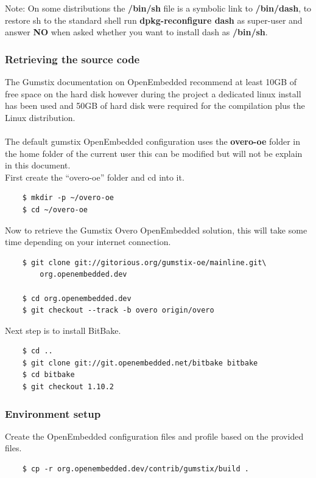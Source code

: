 \documentclass[11pt]{report} %
\begin{document}
		Note: On some distributions the {\bf /bin/sh} file is a symbolic link
		to  {\bf /bin/dash}, to restore sh to the standard shell run
		{\bf dpkg-reconfigure dash} as super-user and answer {\bf NO} when
		asked whether you want to install dash as {\bf /bin/sh}.

	\subsubsection{Retrieving the source code}
		The Gumstix documentation on OpenEmbedded recommend at least 10GB of
		free space on the hard disk however during the project a dedicated 
		linux install has been used and 50GB of hard disk were required for
		the compilation plus the Linux distribution.\\
		\\
		The default gumstix OpenEmbedded configuration uses the {\bf overo-oe}
		folder in the home folder of the current user this can be modified but
		will not be explain in this document.
		\\
		First create the ``overo-oe'' folder and cd into it.
\begin{lstlisting}
	$ mkdir -p ~/overo-oe
	$ cd ~/overo-oe
\end{lstlisting}
		
		Now to retrieve the Gumstix Overo OpenEmbedded solution, this will take
		some time depending on your internet connection.
\begin{lstlisting}
	$ git clone git://gitorious.org/gumstix-oe/mainline.git\
		org.openembedded.dev

	$ cd org.openembedded.dev
	$ git checkout --track -b overo origin/overo
\end{lstlisting}
		
		Next step is to install BitBake.
\begin{lstlisting}
	$ cd ..
	$ git clone git://git.openembedded.net/bitbake bitbake
	$ cd bitbake
	$ git checkout 1.10.2
\end{lstlisting}
		
	\subsubsection{Environment setup}
		Create the OpenEmbedded configuration files and profile based on the
		provided files.
\begin{lstlisting}
	$ cp -r org.openembedded.dev/contrib/gumstix/build .
\end{lstlisting}
		
\end{document}
